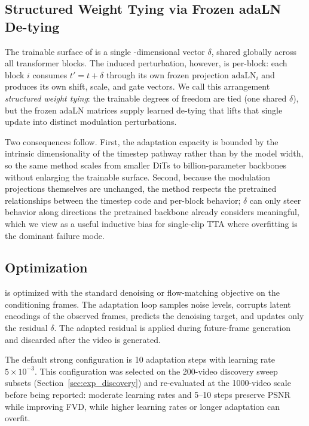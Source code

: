 \subsection{Structured Weight Tying via Frozen adaLN De-tying}
\label{sec:method_tying}

The trainable surface of \method is a single \dimt-dimensional vector $\delta$,
shared globally across all \nblocks transformer blocks. The induced
perturbation, however, is per-block: each block $i$ consumes $t' = t + \delta$
through its own frozen projection $\mathrm{adaLN}_i$ and produces its own
shift, scale, and gate vectors. We call this arrangement \emph{structured
weight tying}: the trainable degrees of freedom are tied (one shared $\delta$),
but the frozen adaLN matrices supply learned de-tying that lifts that single
update into \nblocks distinct modulation perturbations.

Two consequences follow. First, the adaptation capacity is bounded by the
intrinsic dimensionality of the timestep pathway rather than by the model
width, so the same method scales from smaller DiTs to billion-parameter
backbones without enlarging the trainable surface. Second, because the
modulation projections themselves are unchanged, the method respects the
pretrained relationships between the timestep code and per-block behavior;
$\delta$ can only steer behavior along directions the pretrained backbone
already considers meaningful, which we view as a useful inductive bias for
single-clip TTA where overfitting is the dominant failure mode.

\subsection{Optimization}
\label{sec:method_optim}

\method is optimized with the standard denoising or flow-matching objective on
the conditioning frames. The adaptation loop samples noise levels, corrupts
latent encodings of the observed frames, predicts the denoising target, and
updates only the \method residual $\delta$. The adapted residual is applied
during future-frame generation and discarded after the video is generated.

The default strong configuration is 10 adaptation steps with learning rate
$5\!\times\!10^{-3}$. This configuration was selected on the 200-video
discovery sweep subsets (Section~\ref{sec:exp_discovery}) and re-evaluated at
the 1000-video scale before being reported: moderate learning rates and
5--10 steps preserve PSNR while improving FVD, while higher learning rates or
longer adaptation can overfit.


